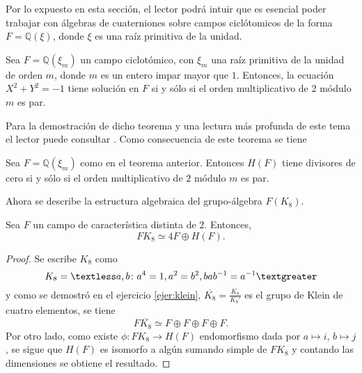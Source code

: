 Por lo expuesto en esta sección, el lector podrá intuir que es esencial poder trabajar con álgebras de cuaterniones sobre campos ciclótomicos de la forma $F = \mathds{Q}(\xi)$, donde $\xi$ es una raíz primitiva de la unidad. 

\begin{teorema}
Sea $F = \mathds{Q}(\xi_m)$ un campo ciclotómico, con $\xi_m$ una raíz primitiva de la unidad de orden $m$, donde $m$ es un entero impar mayor que $1$. Entonces, la ecuación $X^2 + Y^2 = -1$ tiene solución en $F$ si y sólo si el orden multiplicativo de $2$ módulo $m$ es par.
\end{teorema}

Para la demostración de dicho teorema y una lectura más profunda de este tema el lector puede consultar \cite{bib:moser}. Como consecuencia de este teorema se tiene
\begin{lema}
Sea $F = \mathds{Q}(\xi_m)$ como en el teorema anterior. Entonces $H(F)$ tiene divisores de cero si y sólo si el orden multiplicativo de $2$ módulo $m$ es par.
\end{lema}

Ahora se describe la estructura algebraica del grupo-álgebra $F(K_8)$.

\begin{lema}\label{lem:K8}
Sea $F$ un campo de característica distinta de $2 $. Entonces,
\begin{equation*}
FK_8 \simeq 4F\oplus H(F).
\end{equation*}
\end{lema}
\begin{proof}
Se escribe $K_8$ como
\begin{equation*}
K_8 = \textless a, b \colon a^4 = 1, a^2 = b^2, bab^{-1} = a^{-1} \textgreater
\end{equation*}
y como se demostró en el ejercicio \ref{ejer:klein}, $\overline{K_8} = \frac{K_8}{K_8'}$ es el grupo de Klein de cuatro elementos, se tiene
\begin{equation*}
F\overline{K_8} \simeq F \oplus F \oplus F \oplus F.
\end{equation*}
Por otro lado, como existe $\phi \colon FK_8 \to H(F)$ endomorfismo dada por $a \mapsto i$, $b \mapsto j$, se sigue que $H(F)$ es isomorfo a algún sumando simple de $FK_8$ y contando las dimensiones se obtiene el resultado. 
\end{proof}

